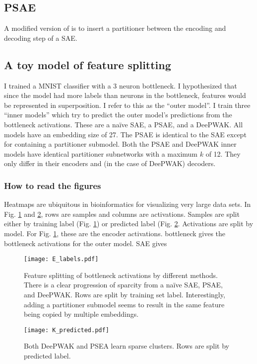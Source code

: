 \subsection{PSAE}
A modified version of \DeePWAK is to insert a partitioner between the encoding and decoding step of a SAE.

\subsection{A toy model of feature splitting}
I trained a MNIST classifier with a 3 neuron bottleneck.
I hypothesized that since the model had more labels than neurons in the bottleneck, features would be represented in superposition.
I refer to this as the ``outer model''.
I train three ``inner models'' which try to predict the outer model's predictions from the bottleneck activations.
These are a na\"ive SAE, a PSAE, and a DeePWAK.
All models have an embedding size of 27.
The PSAE is identical to the SAE except for containing a partitioner submodel.
Both the PSAE and DeePWAK inner models have identical partitioner subnetworks with a maximum $k$ of 12.
They only differ in their encoders and (in the case of DeePWAK) decoders.

\subsubsection{How to read the figures}
Heatmaps are ubiquitous in bioinformatics for visualizing very large data sets.
In Fig. \ref{fig:E_MNIST} and \ref{fig:K_MNIST}, rows are samples and columns are activations.
Samples are split either by training label (Fig. \ref{fig:E_MNIST}) or predicted label (Fig. \ref{fig:K_MNIST}.
Activations are split by model.
For Fig. \ref{fig:E_MNIST}, these are the encoder activations.
\textsf{bottleneck} gives the bottleneck activations for the outer model.
\textsf{SAE} gives 


\begin{figure}
  \texttt{[image: E\_labels.pdf]}
  \caption{Feature splitting of bottleneck activations by different methods.
    There is a clear progression of sparcity from a na\"ive SAE, PSAE, and DeePWAK.
    Rows are split by training set label.
    Interestingly, adding a partitioner submodel seems to result in the same feature being copied by multiple embeddings.}
    \label{fig:E_MNIST}
\end{figure}

\begin{figure}
  \texttt{[image: K\_predicted.pdf]}
    \caption{Both DeePWAK and PSEA learn sparse clusters. Rows are split by predicted label.}
    \label{fig:K_MNIST}
\end{figure}

